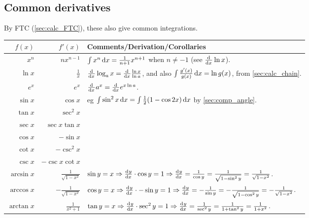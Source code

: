 \documentclass[a4paper,11pt]{article}
\begin{document}
    \subsection{Common derivatives} \label{calc:common}


    By FTC (\ref{sec:calc_FTC}), these also give common integrations.

    \begin{center}
    \begin{longtable}{rrl}
    \toprule
    \boldmath$f(x)$ & \boldmath$f'(x)$ &
    \bfseries Comments/Derivation/Corollaries \\
    \midrule
    \endhead
    $x^n$ & $nx^{n-1}$
        & $\int x^n \dif x = \frac{1}{n + 1}x^{n + 1}$ when
          $n \neq -1$ (see $\od{}{x}\ln x$).\\
    $\ln x$ & $\frac{1}{x}$
        & $\od{}{x}\log_a x = \od{}{x} \frac{\ln x}{\ln a}$, and also
          $\int \frac{g'(x)}{g(x)} \dif x = \ln g(x)$,
            from \ref{sec:calc_chain}.\\
    $e^x$ & $e^x$ & $\od{}{x}a^x = \od{}{x}e^{x \ln a}$. \\
    $\sin x$ & $\cos x$
        & eg $\int \sin^2 x \dif x = \int \frac 12 (1 - \cos 2x) \dif x$
          by \ref{sec:comp_angle}. \\
    $\tan x$ & $\sec^2 x$ \\
    $\sec x$ & $\sec x \tan x$ \\
    $\cos x$ & $-\sin x$ \\
    $\cot x$ & $-\csc^2 x$ \\
    $\csc x$ & $-\csc x \cot x$ \\
    $\arcsin x$ & $\frac{1}{\sqrt{1 - x^2}}$
        & $\sin y = x \Rightarrow \od yx \cdot \cos y = 1 \Rightarrow
           \od yx = \frac{1}{\cos y}
         = \frac{1}{\sqrt{1 - \sin^2 y}} = \frac{1}{\sqrt{1 - x^2}}$. \\
    $\arccos x$ & $-\frac{1}{\sqrt{1 - x^2}}$
        & $\cos y = x \Rightarrow \od yx \cdot -\sin y = 1 \Rightarrow
           \od yx = -\frac{1}{\sin y}
         = -\frac{1}{\sqrt{1 - \cos^2 y}} = -\frac{1}{\sqrt{1 - x^2}}$. \\
    $\arctan x$ & $\frac{1}{x^2 + 1}$
        & $\tan y = x \Rightarrow \od yx \cdot \sec^2 y = 1 \Rightarrow
           \od yx = \frac{1}{\sec^2 y} = \frac{1}{1 + \tan^2 y}
         = \frac{1}{1 + x^2}$. \\
    \bottomrule
    \end{longtable}
    \end{center}
\end{document}
